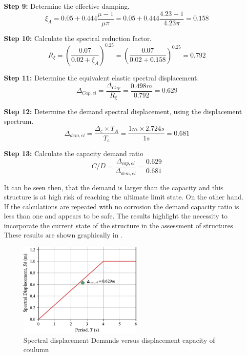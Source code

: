 \textbf{Step 9:} Determine the effective damping.
\begin{displaymath}
    \xi_{A}=0.05+0.444\frac{\mu-1}{\mu\pi}=0.05+0.444\frac{4.23-1}{4.23\pi}=0.158
\end{displaymath}

\textbf{Step 10:} Calculate the spectral reduction factor.
\begin{displaymath}
     R_{\xi}=\left(\frac{0.07}{0.02+\xi_{A}}\right)^{0.25}=\left(\frac{0.07}{0.02+0.158}\right)^{0.25}=0.792
\end{displaymath}

\textbf{Step 11:} Determine the equivalent elastic spectral displacement.
\begin{displaymath}
     \Delta_{Cap,el}=\frac{\Delta_{Cap}}{R_{\xi}}=\frac{0.498m}{0.792}=0.629
\end{displaymath}

\textbf{Step 12:} Determine the demand spectral displacement, using the displacement spectrum.
\begin{displaymath}
     \Delta_{dem,el}=\frac{\Delta_{c} \times T_{A}}{T_{c}}=\frac{1m \times 2.724s}{1s}=0.681
\end{displaymath}

\textbf{Step 13:} Calculate the capacity demand ratio
\begin{displaymath}
     C/D= \frac{\Delta_{cap,el}}{\Delta_{dem,el}}= \frac{0.629}{0.681}
\end{displaymath}

It can be seen then, that the demand is larger than the capacity and this structure is at high risk of reaching the ultimate limit state. On the other hand. If the calculations are repeated with no corrosion the demand capacity ratio is less than one and appears to be safe. The results highlight the necessity to incorporate the current state of the structure in the assessment of structures. These results are shown graphically in .

\begin{figure}[htbp]
	\centering
	\includegraphics[width=0.55\textwidth]{VAC Thesis 2.0/Chapter-6/figs/SD_Assessment_9_75.pdf}
	\caption{Spectral displacement Demands versus displacement capacity of coulumn}
	\label{fig:force_displacement_assessment}
\end{figure}

